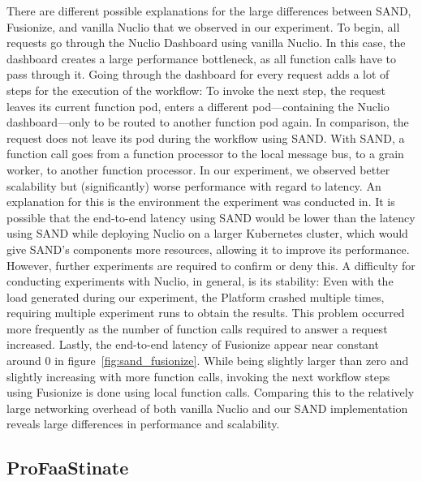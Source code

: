 There are different possible explanations for the large differences between SAND, Fusionize, and vanilla Nuclio that we observed in our experiment.
To begin, all requests go through the Nuclio Dashboard using vanilla Nuclio.
In this case, the dashboard creates a large performance bottleneck, as all function calls have to pass through it.
Going through the dashboard for every request adds a lot of steps for the execution of the workflow: To invoke the next step, the request leaves its current function pod, enters a different pod—containing the Nuclio dashboard—only to be routed to another function pod again.
In comparison, the request does not leave its pod during the workflow using SAND. 
With SAND, a function call goes from a function processor to the local message bus, to a grain worker, to another function processor.
In our experiment, we observed better scalability but (significantly) worse performance with regard to latency.
An explanation for this is the environment the experiment was conducted in.
It is possible that the end-to-end latency using SAND would be lower than the latency using SAND while deploying Nuclio on a larger Kubernetes cluster, which would give SAND's components more resources, allowing it to improve its performance.
However, further experiments are required to confirm or deny this.
A difficulty for conducting experiments with Nuclio, in general, is its stability: Even with the load generated during our experiment, the Platform crashed multiple times, requiring multiple experiment runs to obtain the results.
This problem occurred more frequently as the number of function calls required to answer a request increased.
Lastly, the end-to-end latency of Fusionize appear near constant around 0 in figure~\ref{fig:sand_fusionize}.
While being slightly larger than zero and slightly increasing with more function calls, invoking the next workflow steps using Fusionize is done using local function calls. 
Comparing this to the relatively large networking overhead of both vanilla Nuclio and our SAND implementation reveals large differences in performance and scalability.

\subsection{ProFaaStinate}

%
%

